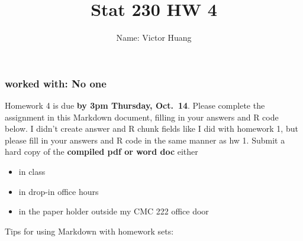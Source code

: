 \documentclass[
]{article}
\title{Stat 230 HW 4}
\author{Name: Victor Huang}
\date{}
\providecommand{\tightlist}{%
  \setlength{\itemsep}{0pt}\setlength{\parskip}{0pt}}
\begin{document}
\maketitle

\hypertarget{worked-with-no-one}{%
\subsubsection{worked with: No one}\label{worked-with-no-one}}

Homework 4 is due \textbf{by 3pm Thursday, Oct.~14}. Please complete the
assignment in this Markdown document, filling in your answers and R code
below. I didn't create answer and R chunk fields like I did with
homework 1, but please fill in your answers and R code in the same
manner as hw 1. Submit a hard copy of the \textbf{compiled pdf or word
doc} either

\begin{itemize}
\tightlist
\item
  in class
\item
  in drop-in office hours
\item
  in the paper holder outside my CMC 222 office door
\end{itemize}

Tips for using Markdown with homework sets:
\end{document}
